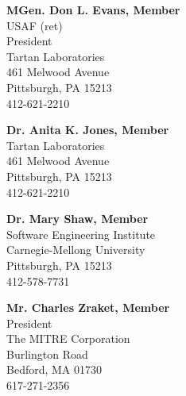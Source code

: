 \documentclass[11pt,final]{article}
\begin{document}
\medskip

\textbf{MGen. Don L. Evans, Member}\\
\hspace*{2cm}USAF (ret)\\
\hspace*{2cm}President\\
\hspace*{2cm}Tartan Laboratories\\
\hspace*{2cm}461 Melwood Avenue\\
\hspace*{2cm}Pittsburgh, PA 15213\\
\hspace*{2cm}412-621-2210

\medskip

\textbf{Dr. Anita K. Jones, Member}\\
\hspace*{2cm}Tartan Laboratories\\
\hspace*{2cm}461 Melwood Avenue\\
\hspace*{2cm}Pittsburgh, PA 15213\\
\hspace*{2cm}412-621-2210

\medskip

\textbf{Dr. Mary Shaw, Member}\\
\hspace*{2cm}Software Engineering Institute\\
\hspace*{2cm}Carnegie-Mellong University\\
\hspace*{2cm}Pittsburgh, PA 15213\\
\hspace*{2cm}412-578-7731

\medskip

\textbf{Mr. Charles Zraket, Member}\\
\hspace*{2cm}President\\
\hspace*{2cm}The MITRE Corporation\\
\hspace*{2cm}Burlington Road\\
\hspace*{2cm}Bedford, MA 01730\\
\hspace*{2cm}617-271-2356
\end{document}
